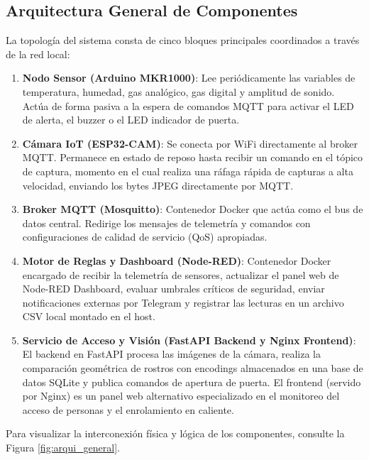 \documentclass[12pt,letterpaper]{article}
\begin{document}
\subsection{Arquitectura General de Componentes}
La topología del sistema consta de cinco bloques principales coordinados a través de la red local:
\begin{enumerate}
    \item \textbf{Nodo Sensor (Arduino MKR1000)}: Lee periódicamente las variables de temperatura, humedad, gas analógico, gas digital y amplitud de sonido. Actúa de forma pasiva a la espera de comandos MQTT para activar el LED de alerta, el buzzer o el LED indicador de puerta.
    \item \textbf{Cámara IoT (ESP32-CAM)}: Se conecta por WiFi directamente al broker MQTT. Permanece en estado de reposo hasta recibir un comando en el tópico de captura, momento en el cual realiza una ráfaga rápida de capturas a alta velocidad, enviando los bytes JPEG directamente por MQTT.
    \item \textbf{Broker MQTT (Mosquitto)}: Contenedor Docker que actúa como el bus de datos central. Redirige los mensajes de telemetría y comandos con configuraciones de calidad de servicio (QoS) apropiadas.
    \item \textbf{Motor de Reglas y Dashboard (Node-RED)}: Contenedor Docker encargado de recibir la telemetría de sensores, actualizar el panel web de Node-RED Dashboard, evaluar umbrales críticos de seguridad, enviar notificaciones externas por Telegram y registrar las lecturas en un archivo CSV local montado en el host.
    \item \textbf{Servicio de Acceso y Visión (FastAPI Backend y Nginx Frontend)}: El backend en FastAPI procesa las imágenes de la cámara, realiza la comparación geométrica de rostros con encodings almacenados en una base de datos SQLite y publica comandos de apertura de puerta. El frontend (servido por Nginx) es un panel web alternativo especializado en el monitoreo del acceso de personas y el enrolamiento en caliente.
\end{enumerate}

Para visualizar la interconexión física y lógica de los componentes, consulte la Figura \ref{fig:arqui_general}.
\end{document}
